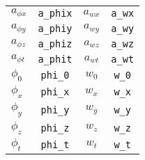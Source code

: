 \begin{table}[htb]
\begin{tabular}{l c | c c}
$ a_{\phi x}$ 	& \texttt{a\_phix}  &  $ a_{wx}$	 & \texttt{a\_wx}   \\
$ a_{\phi y}$ 	& \texttt{a\_phiy}	&  $ a_{wy}$	 & \texttt{a\_wy}   \\
$ a_{\phi z}$ 	& \texttt{a\_phiz}	&  $ a_{wz}$	 & \texttt{a\_wz}   \\ 
$ a_{\phi t}$ 	& \texttt{a\_phit}	&  $ a_{wt}$	 & \texttt{a\_wt}   \\ 
$ \phi_{0}$ 		&  \texttt{phi\_0}	&  $ w_{0}$ 		& \texttt{w\_0}   \\ 
$ \phi_{x}$ 	& \texttt{phi\_x}	&  $ w_{x}$ 	& \texttt{w\_x}   \\
$ \phi_{y}$ 	& \texttt{phi\_y}	&  $ w_{y}$ 	& \texttt{w\_y}   \\ 
$ \phi_{z}$ 	& \texttt{phi\_z}	&  $ w_{z}$ 	& \texttt{w\_z}   \\ 
$ \phi_{t}$ 	& \texttt{phi\_t}	&    $w_{t}$ 	& \texttt{w\_t}  \\
\hline
\end{tabular}
\label{table_aux_var02}
\end{table}






